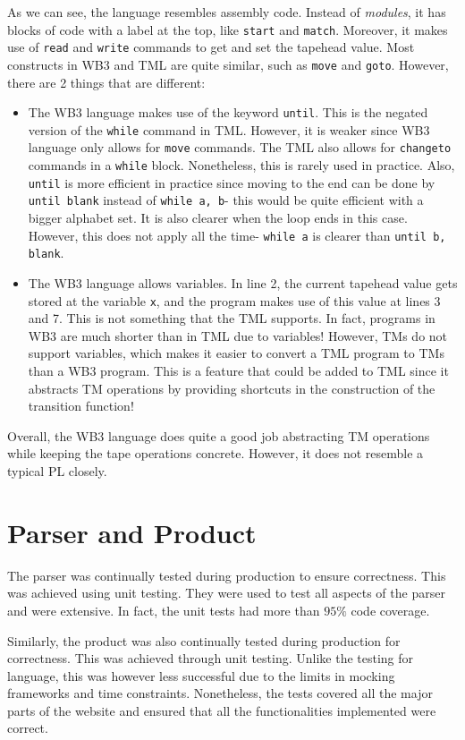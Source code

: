 As we can see, the language resembles assembly code. Instead of \textit{modules}, it has blocks of code with a label at the top, like \texttt{start} and \texttt{match}. Moreover, it makes use of \texttt{read} and \texttt{write} commands to get and set the tapehead value. Most constructs in WB3 and TML are quite similar, such as \texttt{move} and \texttt{goto}. However, there are 2 things that are different:
\begin{itemize}
    \item The WB3 language makes use of the keyword \texttt{until}. This is the negated version of the \texttt{while} command in TML. However, it is weaker since WB3 language only allows for \texttt{move} commands. The TML also allows for \texttt{changeto} commands in a \texttt{while} block. Nonetheless, this is rarely used in practice. Also, \texttt{until} is more efficient in practice since moving to the end can be done by \texttt{until blank} instead of \texttt{while a, b}- this would be quite efficient with a bigger alphabet set. It is also clearer when the loop ends in this case. However, this does not apply all the time- \texttt{while a} is clearer than \texttt{until b, blank}.
    
    \item The WB3 language allows variables. In line 2, the current tapehead value gets stored at the variable \texttt{x}, and the program makes use of this value at lines 3 and 7. This is not something that the TML supports. In fact, programs in WB3 are much shorter than in TML due to variables! However, TMs do not support variables, which makes it easier to convert a TML program to TMs than a WB3 program. This is a feature that could be added to TML since it abstracts TM operations by providing shortcuts in the construction of the transition function!
\end{itemize}
Overall, the WB3 language does quite a good job abstracting TM operations while keeping the tape operations concrete. However, it does not resemble a typical PL closely.

\section{Parser and Product}
The parser was continually tested during production to ensure correctness. This was achieved using unit testing. They were used to test all aspects of the parser and were extensive. In fact, the unit tests had more than $95\%$ code coverage.

Similarly, the product was also continually tested during production for correctness. This was achieved through unit testing. Unlike the testing for language, this was however less successful due to the limits in mocking frameworks and time constraints. Nonetheless, the tests covered all the major parts of the website and ensured that all the functionalities implemented were correct. 

